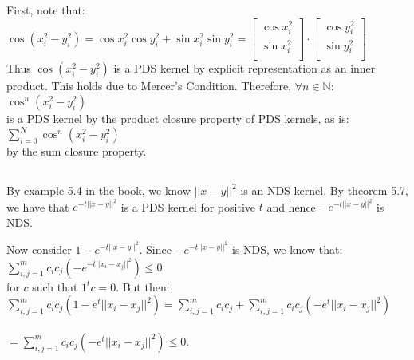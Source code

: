 \documentclass[]{article}
\begin{document}
First, note that:\\ $\cos(x_i^2-y_i^2) = \cos x_i^2 \cos y_i^2 + \sin x_i^2 \sin y_i^2 
= \left[
\begin{array}{c}
\cos x_i^2\\
\sin x_i^2\\
\end{array}
\right]
\cdot
\left[
\begin{array}{c}
\cos y_i^2\\
\sin y_i^2\\
\end{array}
\right]$\\

Thus $\cos(x_i^2-y_i^2)$ is a PDS kernel by explicit representation as an inner product. This holds due to Mercer's Condition. Therefore, $\forall n \in \mathbb{N}$:\\

 $\cos^n(x_i^2-y_i^2)$\\
 
 \noindent is a PDS kernel by the product closure property of PDS kernels, as is:\\
 
 $\sum_{i=0}^{N} \cos^n(x_i^2-y_i^2)$\\
 
 \noindent by the sum closure property.
 
 \subsection{}
 
 By example 5.4 in the book, we know $||x-y||^2$ is an NDS kernel. By theorem 5.7, we have that $e^{-t||x-y||^2}$ is a PDS kernel for positive $t$ and hence $-e^{-t||x-y||^2}$ is NDS.

Now consider $1-e^{-t||x-y||^2}$. Since $-e^{-t||x-y||^2}$ is NDS, we know that:\\

$\sum_{i,j=1}^{m}c_i c_j (-e^{-t||x_i - x_j||^2}) \le 0$\\

\noindent for $c$ such that $1^t c = 0$. But then:\\

$\sum_{i,j=1}^{m}c_i c_j (1-e^t||x_i - x_j||^2) = \sum_{i,j=1}^{m} c_i c_j + \sum_{i,j=1}^{m}c_i c_j (-e^t||x_i - x_j||^2)$\\\\
$= \sum_{i,j=1}^{m}c_i c_j (-e^t||x_i - x_j||^2) \le 0.$\\
\end{document}
